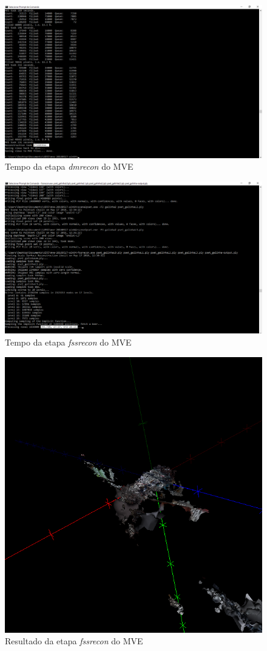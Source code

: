\begin{figure}[!h]
	\centering
	\includegraphics[width=0.5\linewidth]{figs/galinhadmreconmve.png}
	\caption{%
	Tempo da etapa \emph{dmrecon} do MVE
	}\label{fig:dmrecon1}
\end{figure}

\begin{figure}[!h]
	\centering
	\includegraphics[width=0.7\linewidth]{figs/mvefssrecongalinha.png}
	\caption{%
	Tempo da etapa \emph{fssrecon} do MVE
	}\label{fig:fssrecon}
\end{figure}

\begin{figure}[!h]
	\centering
	\includegraphics[width=0.7\linewidth]{figs/galinhadmr.png}
	\caption{%
	Resultado da etapa \emph{fssrecon} do MVE
	}\label{fig:galinhaFssr}
\end{figure}

